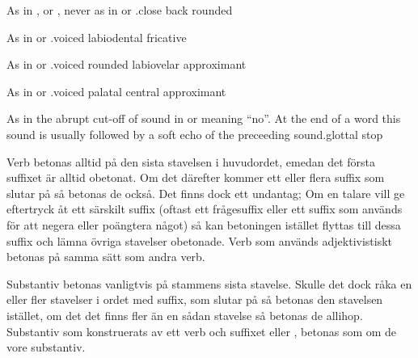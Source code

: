 %
  {\textipa{[u]} As in ,  or ,
  never as in  or .}{close back rounded}

%
  {\textipa{[v]} As in  or
  .}{voiced labiodental fricative}

%
  {\textipa{[w]} As in  or .}{voiced
  rounded labiovelar approximant}

%
  {\textipa{[j]} As in  or .}{voiced palatal
  central approximant}

%
  {\textipa{[P]} As in the abrupt cut-off of sound in  or
  \mbox{} meaning ``no''. At the end of a word this sound
  is usually followed by a soft echo of the preceeding sound.}{glottal
  stop}



\noindent Verb betonas alltid på den sista stavelsen i huvudordet,
emedan det första suffixet är alltid obetonat. Om det därefter kommer
ett eller flera suffix som slutar på  så betonas de också. Det
finns dock ett undantag; Om en talare vill ge eftertryck åt ett
särskilt suffix (oftast ett frågesuffix eller ett suffix som används
för att negera eller poängtera något) så kan betoningen istället
flyttas till dessa suffix och lämna övriga stavelser obetonade. Verb
som används adjektivistiskt betonas på samma sätt som andra verb.

Substantiv betonas vanligtvis på stammens sista stavelse. Skulle det
dock råka en eller fler stavelser i ordet med suffix, som slutar på
 så betonas den stavelsen istället, om det det finns fler än en sådan
stavelse så betonas de allihop. Substantiv som konstruerats av ett
verb och suffixet  eller , betonas som om de vore
substantiv.

\clearpage
